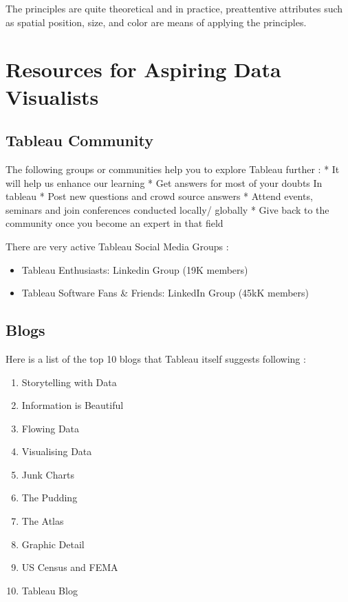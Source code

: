 \documentclass[]{book}
\providecommand{\tightlist}{%
  \setlength{\itemsep}{0pt}\setlength{\parskip}{0pt}}
\theoremstyle{definition}
\theoremstyle{definition}
\theoremstyle{definition}
\theoremstyle{remark}
\begin{document}
The principles are quite theoretical and in practice, preattentive
attributes such as spatial position, size, and color are means of
applying the principles.

\section{Resources for Aspiring Data
Visualists}\label{resources-for-aspiring-data-visualists}

\subsection{Tableau Community}\label{tableau-community}

The following groups or communities help you to explore Tableau further
\citep{Tableau_Community}: * It will help us enhance our learning * Get
answers for most of your doubts In tableau * Post new questions and
crowd source answers * Attend events, seminars and join conferences
conducted locally/ globally * Give back to the community once you become
an expert in that field

There are very active Tableau Social Media Groups
\citep{LinkedIn_Groups}:

\begin{itemize}
\tightlist
\item
  Tableau Enthusiasts: Linkedin Group (19K members)
\item
  Tableau Software Fans \& Friends: LinkedIn Group (45kK members)
\end{itemize}

\subsection{Blogs}\label{blogs}

Here is a list of the top 10 blogs that Tableau itself suggests
following \citep{Top_10_Blogs}:

\begin{enumerate}
\def\labelenumi{\arabic{enumi}.}
\tightlist
\item
  Storytelling with Data
\item
  Information is Beautiful
\item
  Flowing Data
\item
  Visualising Data
\item
  Junk Charts
\item
  The Pudding
\item
  The Atlas
\item
  Graphic Detail
\item
  US Census and FEMA
\item
  Tableau Blog
\end{enumerate}
\end{document}
